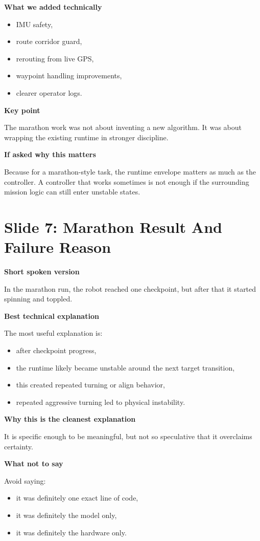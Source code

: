\documentclass[11pt]{article}
\begin{document}
\textbf{What we added technically}
\begin{itemize}[leftmargin=*]
\item IMU safety,
\item route corridor guard,
\item rerouting from live GPS,
\item waypoint handling improvements,
\item clearer operator logs.
\end{itemize}

\textbf{Key point}

The marathon work was not about inventing a new algorithm. It was about wrapping the existing runtime in stronger discipline.

\textbf{If asked why this matters}

Because for a marathon-style task, the runtime envelope matters as much as the controller. A controller that works sometimes is not enough if the surrounding mission logic can still enter unstable states.

\section*{Slide 7: Marathon Result And Failure Reason}
\textbf{Short spoken version}

In the marathon run, the robot reached one checkpoint, but after that it started spinning and toppled.

\textbf{Best technical explanation}

The most useful explanation is:
\begin{itemize}[leftmargin=*]
\item after checkpoint progress,
\item the runtime likely became unstable around the next target transition,
\item this created repeated turning or align behavior,
\item repeated aggressive turning led to physical instability.
\end{itemize}

\textbf{Why this is the cleanest explanation}

It is specific enough to be meaningful, but not so speculative that it overclaims certainty.

\textbf{What not to say}

Avoid saying:
\begin{itemize}[leftmargin=*]
\item it was definitely one exact line of code,
\item it was definitely the model only,
\item it was definitely the hardware only.
\end{itemize}
\end{document}
